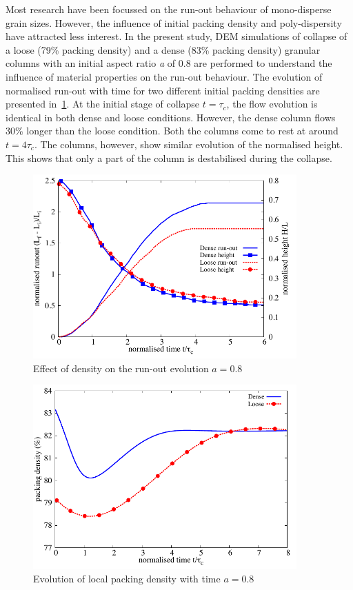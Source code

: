 Most research have been focussed on the run-out behaviour of mono-disperse 
grain sizes. However, the influence of initial packing density and 
poly-dispersity have attracted less interest. In the present study, DEM 
simulations of collapse of a loose (79\% packing density) and a dense (83\% 
packing density) granular columns with an initial aspect ratio \textit{a} of 
0.8 are performed to understand the influence of material properties on the 
run-out behaviour. The evolution of normalised run-out with time for two 
different initial packing densities are presented 
in~\cref{fig:runout_height_dense_r18}. At the initial 
stage of collapse $t=\tau_c$, the flow evolution is identical in both dense and 
loose conditions. However, the dense column flows 30\% longer than the loose 
condition. Both the columns come to rest at around $t = 4\tau_c$. The columns, 
however, show similar evolution of the normalised height. This shows that only 
a part of the column is destabilised during the collapse.
\begin{figure}[h]
\centering
\includegraphics[width=0.9\textwidth]{runout_height_dense_r18}
\caption{Effect of density on the run-out evolution $a = 0.8$}
\label{fig:runout_height_dense_r18}
\end{figure}

\begin{figure}[h]
\centering
\includegraphics[width=0.9\textwidth]{voro_r18}
\caption{Evolution of local packing density with time $a = 0.8$}
\label{fig:voro_r18}
\end{figure}

